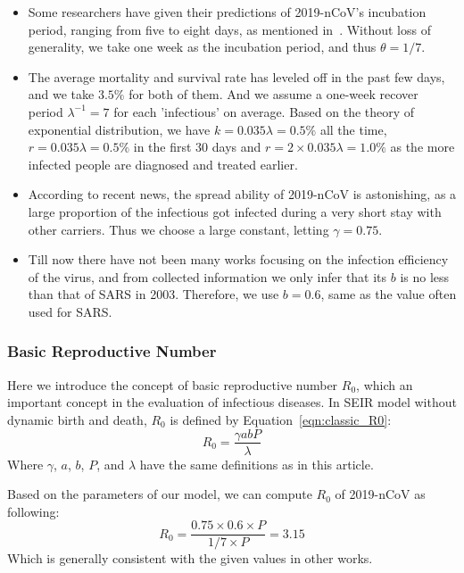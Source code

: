 \documentclass[12pt]{mcmthesis}
\begin{document}
\begin{itemize}
    \item Some researchers have given their predictions of 2019-nCoV's incubation period, ranging from five to eight days, as mentioned in~\cite{inc_1,inc_2, inc_3}. Without loss of generality, we take one week as the incubation period, and thus $\theta = 1 / 7$.
    \item The average mortality and survival rate has leveled off in the past few days, and we take $3.5\%$ for both of them. And we assume a one-week recover period $\lambda^{-1} = 7$ for each 'infectious' on average. Based on the theory of exponential distribution, we have $k = 0.035\lambda = 0.5\%$ all the time, $r = 0.035\lambda = 0.5\%$ in the first 30 days and $r = 2 \times 0.035\lambda = 1.0\%$ as the more infected people are diagnosed and treated earlier.
    \item According to recent news, the spread ability of 2019-nCoV is astonishing, as a large proportion of the infectious got infected during a very short stay with other carriers. Thus we choose a large constant, letting $\gamma = 0.75$.
    \item Till now there have not been many works focusing on the infection efficiency of the virus, and from collected information we only infer that its $b$ is no less than that of SARS in 2003. Therefore, we use $b = 0.6$, same as the value often used for SARS.
\end{itemize}

\subsubsection{Basic Reproductive Number} \label{subsubSec:R0}
Here we introduce the concept of basic reproductive number $R_0$, which an important concept in the evaluation of infectious diseases. In SEIR model without dynamic birth and death, $R_0$ is defined by Equation~\eqref{eqn:classic_R0}:
\begin{equation} \label{eqn:classic_R0}
    R_0 = \frac{\gamma a b P}{\lambda}
\end{equation}
Where $\gamma$, $a$, $b$, $P$, and $\lambda$ have the same definitions as in this article.

Based on the parameters of our model, we can compute $R_0$ of 2019-nCoV as following:
\begin{equation*}
    R_0 = \frac{0.75 \times 0.6 \times P}{1 / 7 \times P} = 3.15
\end{equation*}
Which is generally consistent with the given values in other works.
\end{document}
